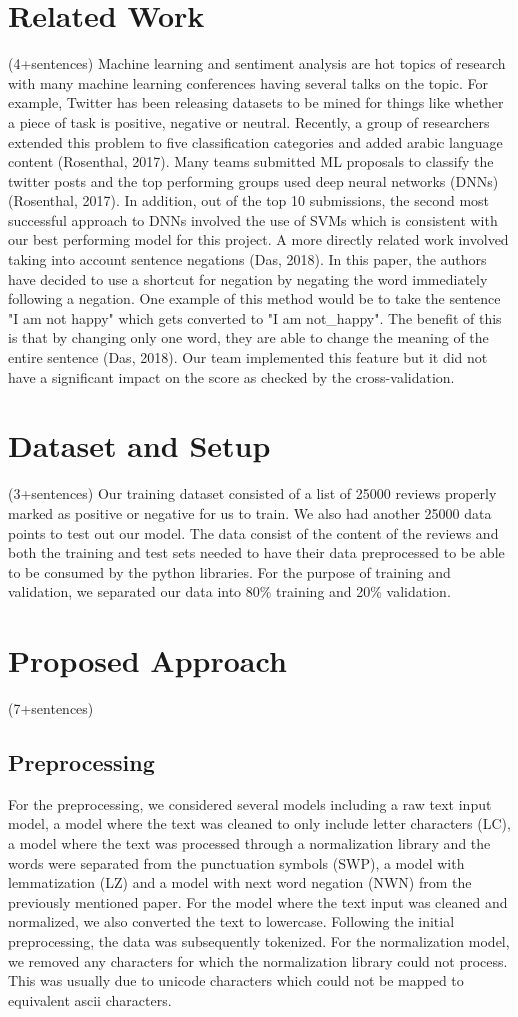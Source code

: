 \documentclass{amsart}
\theoremstyle{definition}
\theoremstyle{remark}
\numberwithin{equation}{section}
\begin{document}
\section{Related Work}(4+sentences)
Machine learning and sentiment analysis are hot topics of research with many machine learning conferences having several talks on the topic.  For example, Twitter has been releasing datasets to be mined for things like whether a piece of task is positive, negative or neutral.  Recently, a group of researchers extended this problem to five classification categories and added arabic language content (Rosenthal, 2017).  Many teams submitted ML proposals to classify the twitter posts and the top performing groups used deep neural networks (DNNs) (Rosenthal, 2017).  In addition, out of the top 10 submissions, the second most successful approach to DNNs involved the use of SVMs which is consistent with our best performing model for this project.  A more directly related work involved taking into account sentence negations (Das, 2018).  In this paper, the authors have decided to use a shortcut for negation by negating the word immediately following a negation.  One example of this method would be to take the sentence "I am not happy" which gets converted to "I am not\_happy".  The benefit of this is that by changing only one word, they are able to change the meaning of the entire sentence (Das, 2018).  Our team implemented this feature but it did not have a significant impact on the score as checked by the cross-validation.
\section{Dataset and Setup}(3+sentences)
Our training dataset consisted of a list of 25000 reviews properly marked as positive or negative for us to train.  We also had another 25000 data points to test out our model.  The data consist of the content of the reviews and both the training and test sets needed to have their data preprocessed to be able to be consumed by the python libraries.  For the purpose of training and validation, we separated our data into 80\% training and 20\% validation.
\section{Proposed Approach}(7+sentences)
\subsection{Preprocessing}
For the preprocessing, we considered several models including a raw text input model, a model where the text was cleaned to only include letter characters (LC), a model where the text was processed through a normalization library and the words were separated from the punctuation symbols (SWP), a model with lemmatization (LZ) and a model with next word negation (NWN) from the previously mentioned paper.  For the model where the text input was cleaned and normalized, we also converted the text to lowercase.  Following the initial preprocessing, the data was subsequently tokenized.  For the normalization model, we removed any characters for which the normalization library could not process.  This was usually due to unicode characters which could not be mapped to equivalent ascii characters.
\end{document}

